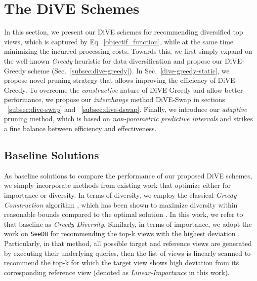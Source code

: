 

\section{The D{i}VE Schemes}
\label{sec:dive_schemes}


In this section, we present our DiVE schemes for recommending diversified top views, which is captured by Eq.~\ref{objectif_function}, while at the same time minimizing the incurred processing costs.
%
Towards this, we first simply expand on the well-known {\em Greedy} heuristic for data diversification and propose our DiVE-Greedy scheme (Sec.~\ref{subsec:dive-greedy}). 
%
In Sec.~\ref{dive-greedy-static}, we propose novel pruning strategy that allows improving the efficiency of DiVE-Greedy. 
%
To overcome the {\em constructive} nature of DiVE-Greedy and allow better performance, we propose our {\em interchange} method DiVE-Swap in sections ~\ref{subsec:dive-swap} and ~\ref{subsec:dive-dswap}.
%
Finally, we introduce our {\em adaptive} pruning method, which is based on {\em non-parametric predictive intervals} and strikes a fine balance between  efficiency and effectiveness. 

\subsection{Baseline Solutions}\label{subsec:baseline}

As baseline solutions to compare the performance of our proposed DiVE schemes, we simply incorporate methods from existing work that optimize either for importance or diversity. 
% 
In terms of diversity, we employ the classical {\em Greedy Construction} algorithm \cite{Smyth2001}, which has been shown to maximize diversity within reasonable bounds compared to the optimal solution \cite{Yu2009, Vieira2011}. 
%
In this work, we refer to that baseline as {\em Greedy-Diversity}. 
%
Similarly, in terms of importance, we adopt the work on {\tt SeeDB} for recommending the top-k views with the highest deviation \cite{Vartak2015, Vartak2014}.
%
Particularly, in that method, all possible target and reference views are generated by executing their underlying queries, then the list of views is linearly scanned to recommend the top-k for which the target view shows high deviation from its corresponding reference view (denoted as {\em Linear-Importance} in this work).
%

